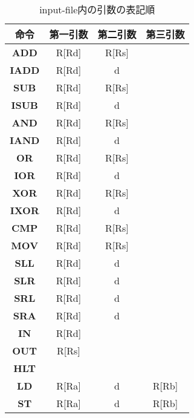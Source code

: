 \documentclass[a4paper,11pt,titlepage]{ltjsarticle}%
\begin{document}
\begin{table}[htbp]
\centering
\caption{input-file内の引数の表記順}
\begin{tabular}{|c|c|c|c|}
\hline
\textbf{命令}  & \textbf{第一引数} & \textbf{第二引数} & \textbf{第三引数} \\ \hline
\textbf{ADD}  & R{[}Rd{]}     & R{[}Rs{]}     &               \\ \hline
\textbf{IADD} & R{[}Rd{]}     & d             &               \\ \hline
\textbf{SUB}  & R{[}Rd{]}     & R{[}Rs{]}     &               \\ \hline
\textbf{ISUB} & R{[}Rd{]}     & d             &               \\ \hline
\textbf{AND}  & R{[}Rd{]}     & R{[}Rs{]}     &               \\ \hline
\textbf{IAND} & R{[}Rd{]}     & d             &               \\ \hline
\textbf{OR}   & R{[}Rd{]}     & R{[}Rs{]}     &               \\ \hline
\textbf{IOR}  & R{[}Rd{]}     & d             &               \\ \hline
\textbf{XOR}  & R{[}Rd{]}     & R{[}Rs{]}     &               \\ \hline
\textbf{IXOR} & R{[}Rd{]}     & d             &               \\ \hline
\textbf{CMP}  & R{[}Rd{]}     & R{[}Rs{]}     &               \\ \hline
\textbf{MOV}  & R{[}Rd{]}     & R{[}Rs{]}     &               \\ \hline
\textbf{SLL}  & R{[}Rd{]}     & d             &               \\ \hline
\textbf{SLR}  & R{[}Rd{]}     & d             &               \\ \hline
\textbf{SRL}  & R{[}Rd{]}     & d             &               \\ \hline
\textbf{SRA}  & R{[}Rd{]}     & d             &               \\ \hline
\textbf{IN}   & R{[}Rd{]}     &               &               \\ \hline
\textbf{OUT}  & R{[}Rs{]}     &               &               \\ \hline
\textbf{HLT}  &            &               &               \\ \hline
\textbf{LD}   & R{[}Ra{]}     & d             & R{[}Rb{]}     \\ \hline
\textbf{ST}   & R{[}Ra{]}     & d             & R{[}Rb{]}     \\ \hline

\end{tabular}
\end{table}
\end{document}

